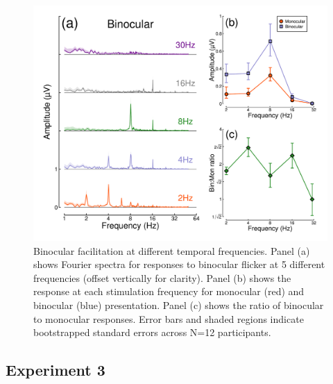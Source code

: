 \documentclass[
]{article}
\begin{document}
\begin{figure}

{\centering \includegraphics{Figures/TFdata} 

}

\caption{Binocular facilitation at different temporal frequencies. Panel (a) shows Fourier spectra for responses to binocular flicker at 5 different frequencies (offset vertically for clarity). Panel (b) shows the response at each stimulation frequency for monocular (red) and binocular (blue) presentation. Panel (c) shows the ratio of binocular to monocular responses. Error bars and shaded regions indicate bootstrapped standard errors across N=12 participants.}\label{fig:TFdata}
\end{figure}

\hypertarget{experiment-3}{%
\subsection{Experiment 3}\label{experiment-3}}
\end{document}
